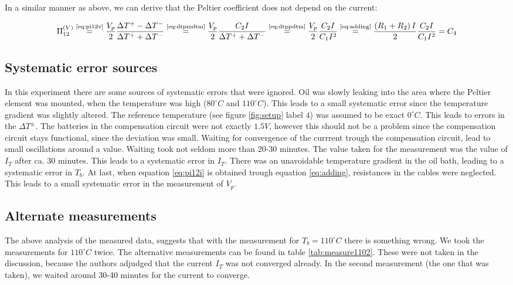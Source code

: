 \documentclass[a4paper]{article}
\begin{document}
In a similar manner as above, we can derive that the Peltier coefficient does not depend on the current:

\begin{equation}
\Pi_{12}^{(V)} \overset{\text{\ref{eq:pi12v}}}{=} \frac{V_p}{2} \frac{\Delta T^{+} - \Delta T^{-}}{\Delta T^{+} + \Delta T^{-}} \overset{\text{\ref{eq:dtpmdtm}}}{=} \frac{V_p}{2} \frac{C_2 I}{\Delta T^{+} + \Delta T^{-}} \overset{\text{\ref{eq:dtppdtm}}}{=} \frac{V_p}{2} \frac{C_2 I}{C_1 I^2} \overset{\text{\ref{eq:adding}}}{=} \frac{\left( R_1 + R_2 \right) I}{2} \frac{C_2 I}{C_1 I^2} = C_4
\end{equation}

\subsection{Systematic error sources}
\label{sec:systematic_errors}

In this experiment there are some sources of systematic errors that were ignored. Oil was slowly leaking into the area where the Peltier element was mounted, when the temperature was high ($80^{\circ}C$ and $110^{\circ}C$). This leads to a small systematic error since the temperature gradient was slightly altered. The reference temperature (see figure \ref{fig:setup} label $4$) was assumed to be exact $0^{\circ}C$. This leads to errors in the $\Delta T^{\pm}$. The batteries in the compensation circuit were not exactly $1.5 V$, however this should not be a problem since the compensation circuit stays functional, since the deviation was small. Waiting for convergence of the currrent trough the compensation circuit, lead to small oscillations around a value. Waiting took not seldom more than 20-30 minutes. The value taken for the measurement was the value of $I_T$ after ca. 30 minutes. This leads to a systematic error in $I_T$. There was an unavoidable temperature gradient in the oil bath, leading to a systematic error in $T_b$. At last, when equation \eqref{eq:pi12i} is obtained trough equation \eqref{eq:adding}, resistances in the cables were neglected. This leads to a small systematic error in the measurement of $V_p$.

\subsection{Alternate measurements}

The above analysis of the measured data, suggests that with the measurement for $T_b = 110^{\circ}C$ there is something wrong. We took the measurements for $110^{\circ}C$ twice. The alternative measurements can be found in table \ref{tab:measure1102}. These were not taken in the discussion, because the authors adjudged that the current $I_T$ was not converged already. In the second measurement (the one that was taken), we waited around 30-40 minutes for the current to converge.
\end{document}

